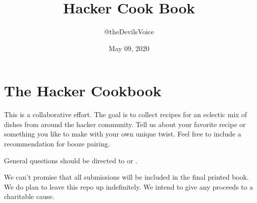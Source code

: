 \documentclass[letterpaper,10pt,english]{sphinxmanual}
\title{Hacker Cook Book}
\date{May 09, 2020}
\author{@theDevilsVoice}
\begin{document}
\pagestyle{empty}
\sphinxmaketitle
\pagestyle{plain}
\sphinxtableofcontents
\pagestyle{normal}
\label{\detokenize{index::doc}}




\chapter{The Hacker Cookbook}
\label{\detokenize{_source/introduction:the-hacker-cookbook}}\label{\detokenize{_source/introduction::doc}}
This is a collaborative effort. The goal is to collect recipes for
an eclectic mix of dishes from around the hacker community. Tell
us about your favorite recipe or something you like to make with
your own unique twist. Feel free to include a recommendation for
booze pairing.

General questions should be directed to  or  .

We can’t promise that all submissions will be included in the final
printed book. We do plan to leave this repo up indefinitely. We
intend to give any proceeds to a charitable cause.
\end{document}
